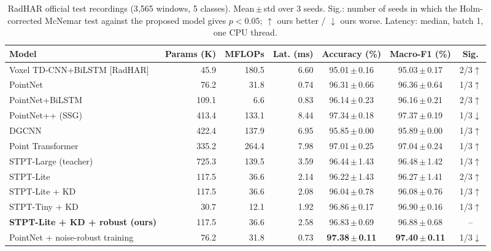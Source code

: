 \begin{table}[t]
\centering
\caption{RadHAR official test recordings (3{,}565 windows, 5 classes). Mean\,$\pm$\,std over 3 seeds. Sig.: number of seeds in which the Holm-corrected McNemar test against the proposed model gives $p<0.05$; $\uparrow$ ours better / $\downarrow$ ours worse. Latency: median, batch 1, one CPU thread.}
\label{tab:radhar}
\setlength{\tabcolsep}{5pt}
\begin{tabular}{lrrrccc}
\toprule
Model & Params (K) & MFLOPs & Lat. (ms) & Accuracy (\%) & Macro-F1 (\%) & Sig. \\
\midrule
Voxel TD-CNN+BiLSTM [RadHAR] & 45.9 & 180.5 & 6.60 & 95.01\,$\pm$\,0.16 & 95.03\,$\pm$\,0.17 & 2/3$\uparrow$ \\
PointNet & 76.2 & 31.8 & 0.74 & 96.31\,$\pm$\,0.66 & 96.36\,$\pm$\,0.64 & 1/3$\uparrow$ \\
PointNet+BiLSTM & 109.1 & 6.6 & 0.83 & 96.14\,$\pm$\,0.23 & 96.16\,$\pm$\,0.21 & 2/3$\uparrow$ \\
PointNet++ (SSG) & 413.4 & 133.1 & 8.44 & 97.34\,$\pm$\,0.18 & 97.37\,$\pm$\,0.19 & 1/3$\downarrow$ \\
DGCNN & 422.4 & 137.9 & 6.95 & 95.85\,$\pm$\,0.00 & 95.89\,$\pm$\,0.00 & 1/3$\uparrow$ \\
Point Transformer & 335.2 & 264.4 & 7.98 & 97.01\,$\pm$\,0.25 & 97.04\,$\pm$\,0.24 & 1/3$\uparrow$ \\
\midrule
STPT-Large (teacher) & 725.3 & 139.5 & 3.59 & 96.44\,$\pm$\,1.43 & 96.48\,$\pm$\,1.42 & 1/3$\uparrow$ \\
STPT-Lite & 117.5 & 36.6 & 2.14 & 96.22\,$\pm$\,1.43 & 96.27\,$\pm$\,1.41 & 2/3$\uparrow$ \\
STPT-Lite + KD & 117.5 & 36.6 & 2.08 & 96.04\,$\pm$\,0.78 & 96.08\,$\pm$\,0.76 & 1/3$\uparrow$ \\
STPT-Tiny + KD & 30.7 & 12.1 & 1.92 & 96.86\,$\pm$\,0.17 & 96.90\,$\pm$\,0.16 & 1/3$\uparrow$ \\
\textbf{STPT-Lite + KD + robust (ours)} & 117.5 & 36.6 & 2.58 & 96.83\,$\pm$\,0.69 & 96.88\,$\pm$\,0.68 & -- \\
PointNet + noise-robust training & 76.2 & 31.8 & 0.73 & \textbf{97.38\,$\pm$\,0.11} & \textbf{97.40\,$\pm$\,0.11} & 1/3$\downarrow$ \\
\bottomrule
\end{tabular}
\end{table}